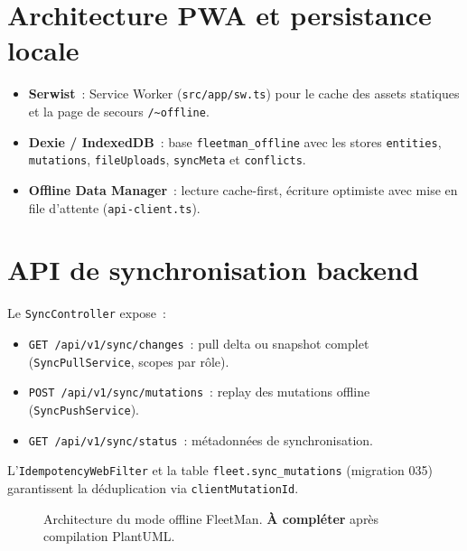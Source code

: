 \documentclass[12pt,a4paper]{report}
\begin{document}
\begin{enumerate}[leftmargin=2cm]
\section{Architecture PWA et persistance locale}

\begin{itemize}[leftmargin=2cm]
  \item \textbf{Serwist}~: Service Worker (\texttt{src/app/sw.ts}) pour le
        cache des assets statiques et la page de secours \texttt{/{\textasciitilde}offline}.
  \item \textbf{Dexie / IndexedDB}~: base \texttt{fleetman\_offline} avec
        les stores \texttt{entities}, \texttt{mutations}, \texttt{fileUploads},
        \texttt{syncMeta} et \texttt{conflicts}.
  \item \textbf{Offline Data Manager}~: lecture cache-first, écriture
        optimiste avec mise en file d'attente (\texttt{api-client.ts}).
\end{itemize}

\section{API de synchronisation backend}

Le \texttt{SyncController} expose~:
\begin{itemize}[leftmargin=2cm]
  \item \texttt{GET /api/v1/sync/changes}~: pull delta ou snapshot complet
        (\texttt{SyncPullService}, scopes par rôle).
  \item \texttt{POST /api/v1/sync/mutations}~: replay des mutations offline
        (\texttt{SyncPushService}).
  \item \texttt{GET /api/v1/sync/status}~: métadonnées de synchronisation.
\end{itemize}

L'\texttt{IdempotencyWebFilter} et la table \texttt{fleet.sync\_mutations}
(migration 035) garantissent la déduplication via \texttt{clientMutationId}.

\begin{figure}[H]
  \centering
  \caption{Architecture du mode offline FleetMan.
           \textbf{À compléter} après compilation PlantUML.}
  \label{fig:offline_arch}
\end{figure}


\end{enumerate}
\end{document}
